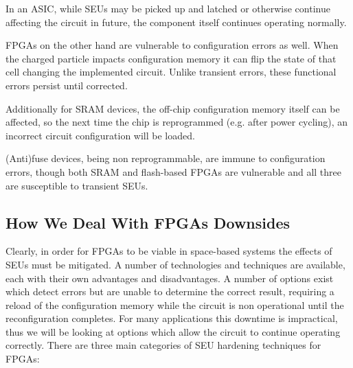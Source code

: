\documentclass[12pt,final,oneside]{dwThesis} %
\begin{document}
   In an \gls{ASIC}, while \glspl{SEU} may be picked up and latched or
   otherwise continue affecting the circuit in future, the component itself
   continues operating normally.

   \glspl{FPGA} on the other hand are vulnerable to configuration errors as
   well. When the charged particle impacts configuration memory it can flip the
   state of that cell changing the implemented circuit. Unlike transient
   errors, these functional errors persist until corrected.

   Additionally for \gls{SRAM} devices, the off-chip configuration memory
   itself can be affected, so the next time the chip is reprogrammed (e.g.
   after power cycling), an incorrect circuit configuration will be loaded.

   (Anti)fuse devices, being non reprogrammable, are immune to configuration
   errors, though both \gls{SRAM} and flash-based \glspl{FPGA} are vulnerable
   and all three are susceptible to transient \glspl{SEU}\cite{HFPP}.


   \subsection{How We Deal With \glspl{FPGA}
      Downsides} Clearly, in order for
   \glspl{FPGA} to be viable in space-based systems the effects of \glspl{SEU}
   must be mitigated. A number of technologies and techniques are available,
   each with their own advantages and disadvantages. A number of options exist
   which detect errors but are unable to determine the correct result,
   requiring a reload of the configuration memory while the circuit is non
   operational until the reconfiguration completes. For many applications this
   downtime is impractical, thus we will be looking at options which allow the
   circuit to continue operating correctly.  There are three main categories of
   \gls{SEU} hardening techniques for \glspl{FPGA}\cite{HardeningTechniques}:
\end{document}
